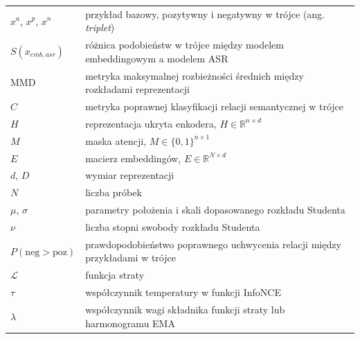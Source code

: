 \begin{longtable}{@{}p{2.6cm}p{\dimexpr\linewidth-2.6cm-2\tabcolsep\relax}@{}}
$x^a$, $x^p$, $x^n$ & przykład bazowy, pozytywny i negatywny w trójce (ang. \textit{triplet}) \\
$S(x_{emb,asr})$ & różnica podobieństw w trójce między modelem embeddingowym a modelem ASR \\
$\mathrm{MMD}$ & metryka maksymalnej rozbieżności średnich między rozkładami reprezentacji \\
$C$ & metryka poprawnej klasyfikacji relacji semantycznej w trójce \\
$H$ & reprezentacja ukryta enkodera, $H \in \mathbb{R}^{n \times d}$ \\
$M$ & maska atencji, $M \in \{0,1\}^{n \times 1}$ \\
$E$ & macierz embeddingów, $E \in \mathbb{R}^{N \times d}$ \\
$d$, $D$ & wymiar reprezentacji \\
$N$ & liczba próbek \\
$\mu$, $\sigma$ & parametry położenia i skali dopasowanego rozkładu Studenta \\
$\nu$ & liczba stopni swobody rozkładu Studenta \\
$P(\mathrm{neg} > \mathrm{poz})$ & prawdopodobieństwo poprawnego uchwycenia relacji między przykładami w trójce \\
$\mathcal{L}$ & funkcja straty \\
$\tau$ & współczynnik temperatury w funkcji InfoNCE \\
$\lambda$ & współczynnik wagi składnika funkcji straty lub harmonogramu EMA \\
\end{longtable}
